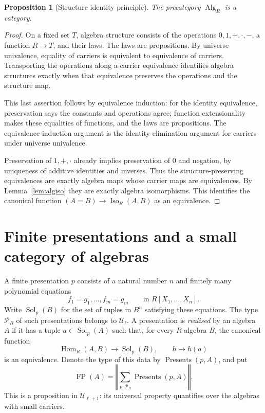 \documentclass[11pt]{amsart}
\newtheorem{proposition}[theorem]{Proposition}
\theoremstyle{definition}
\theoremstyle{remark}
\newcommand{\UU}{\mathcal U}
\newcommand{\Hom}{\operatorname{Hom}}
\newcommand{\Iso}{\operatorname{Iso}}
\newcommand{\Alg}{\operatorname{Alg}}
\newcommand{\FP}{\operatorname{FP}}
\newcommand{\tr}[1]{\left\Vert #1\right\Vert}
\begin{document}
\begin{proposition}[Structure identity principle]\label{prop:alguniv}
The precategory $\Alg_R$ is a category.
\end{proposition}
\begin{proof}
On a fixed set $T$, algebra structure consists of the operations
$0,1,+,\cdot,-$, a function $R\to T$, and their laws. The laws are
propositions. By universe univalence, equality of carriers is equivalent
to equivalence of carriers. Transporting the operations along a carrier
equivalence identifies algebra structures exactly when that equivalence
preserves the operations and the structure map.

This last assertion follows by equivalence induction: for the identity
equivalence, preservation says the constants and operations agree;
function extensionality makes these equalities of functions, and the
laws are propositions. The equivalence-induction argument is the
identity-elimination argument for carriers under universe univalence.

Preservation of $1,+,\cdot$ already implies preservation of $0$ and
negation, by uniqueness of additive identities and inverses. Thus the
structure-preserving equivalences are exactly algebra maps whose carrier
maps are equivalences. By Lemma~\ref{lem:algiso} they are exactly algebra
isomorphisms. This identifies the canonical function
$(A=B)\to\Iso_R(A,B)$ as an equivalence.
\end{proof}

\section{Finite presentations and a small category of algebras}

A finite presentation $p$ consists of a natural number $n$ and finitely
many polynomial equations
\[
 f_1=g_1,\ldots,f_m=g_m\qquad\text{in }R[X_1,\ldots,X_n].
\]
Write $\operatorname{Sol}_p(B)$ for the set of tuples in $B^n$ satisfying
these equations. The type $\mathcal P_R$ of such presentations belongs
to $\UU_\ell$. A presentation is \emph{realised} by an algebra $A$ if
it has a tuple $a\in\operatorname{Sol}_p(A)$ such that, for every
$R$-algebra $B$, the canonical function
\[
 \Hom_R(A,B)\longrightarrow\operatorname{Sol}_p(B),\qquad
 h\longmapsto h(a)
\]
is an equivalence. Denote the type of this data by
$\operatorname{Presents}(p,A)$, and put
\[
 \FP(A)=\tr{\sum_{p:\mathcal P_R}\operatorname{Presents}(p,A)}.
\]
This is a proposition in $\UU_{\ell+1}$: its universal property quantifies
over the algebras with small carriers.
\end{document}
